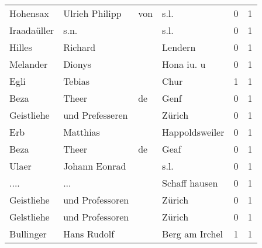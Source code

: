 \begin{center}
\begin{tiny}
\begin{longtabu}{llllrr}
                 Hohensax &                     Ulrieh Philipp &         von &                                        s.l. &          0 &         1 \\
              Iraadaüller &                               s.n. &             &                                        s.l. &          0 &         1 \\
                   Hilles &                            Richard &             &                                     Lendern &          0 &         1 \\
                 Melander &                             Dionys &             &                                  Hona iu. u &          0 &         1 \\
                     Egli &                             Tebias &             &                                        Chur &          1 &         1 \\
                     Beza &                              Theer &          de &                                        Genf &          0 &         1 \\
               Geistliehe &                    und Prefesseren &             &                                      Zürich &          0 &         1 \\
                      Erb &                           Matthias &             &                              Happoldsweiler &          0 &         1 \\
                     Beza &                              Theer &          de &                                        Geaf &          0 &         1 \\
                    Ulaer &                      Johann Eonrad &             &                                        s.l. &          0 &         1 \\
                     .... &                                ... &             &                               Schaff hausen &          0 &         1 \\
               Geistliehe &                    und Professoren &             &                                      Zürich &          0 &         1 \\
               Gelstliehe &                    und Professoren &             &                                      Zürich &          0 &         1 \\
                Bullinger &                        Hans Rudolf &             &                              Berg am Irchel &          1 &         1 \\

\end{longtabu}
\end{tiny}
\end{center}
